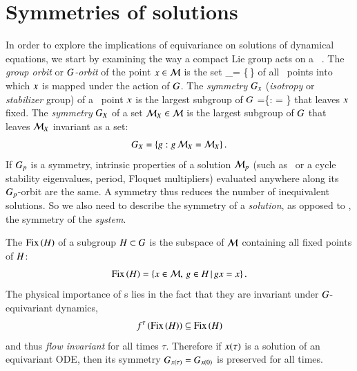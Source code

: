 \documentclass[preprint,number,sort&compress]{elsarticle}
\begin{document}
\section{\label{s:symSol} Symmetries of solutions}

In order to explore the implications of equivariance on
solutions of dynamical equations,  we start by examining the
way a compact Lie group acts on a \statesp\ \pS. The
\emph{group orbit} or \emph{$G$-orbit} of the point
$x \in {\cal M}$ is the set
\beq
    \pS_\ssp = \{\LieEl\,\ssp \mid \LieEl \in {\Group}\}
of all \statesp\ points into which $\ssp$ is mapped under the
action of $\Group$.
The \emph{symmetry} $\stab{\ssp}$ (\emph{isotropy} or
\emph{stabilizer} group) of a \statesp\ point $\ssp$ is the
largest subgroup of $\Group$
\beq
\stab{\ssp} =\{\LieEl \in \Group: \LieEl \ssp = \ssp \}
that leaves $\ssp$ fixed.
The \emph{symmetry} $\stab{X}$ of a set $\pS_X \in \pS$ is
the largest subgroup  of $\Group$ that leaves $\pS_X$
in\-vari\-ant as a set:
\[
	\stab{X}= \{\LieEl: \LieEl \, \pS_X = \pS_X\}
\,.
\]
If $G_{p}$ is a symmetry, intrinsic properties of a
solution ${\cal M}_p$ (such as \eqv\ or a cycle stability
eigenvalues, period, Floquet multipliers) evaluated anywhere
along its $G_{p}$-orbit are the same. A symmetry thus
reduces the number of inequivalent solutions. So we also need
to describe the symmetry of a \emph{solution}, as opposed to
, the symmetry of the \emph{system}.

The \emph{\fixedsp} $\mathrm{Fix}\left(H\right)$ of a subgroup
$H\subset G$ is the subspace of ${\cal M}$ containing
all fixed points of $H$:
\[
	\mathrm{Fix}\left(H\right)=
      \{x\in{\cal M},\,g\in H \,|\,
        g x = x \}
\,.
\]
The physical importance of \fixedsp s lies in the fact that
they are in\-vari\-ant under $G$-equi\-vari\-ant
dynamics,
\[
 f^\tau\left(\mathrm{Fix}\left(H\right)\right)\subseteq \mathrm{Fix}\left(H\right)
\]
and thus \emph{flow in\-vari\-ant} for all times $\tau$.
Therefore if $x(\tau)$ is a solution of an equi\-vari\-ant ODE,
then its symmetry $G_{x(\tau)}=G_{x(0)}$ is
preserved for all times.
\end{document}
